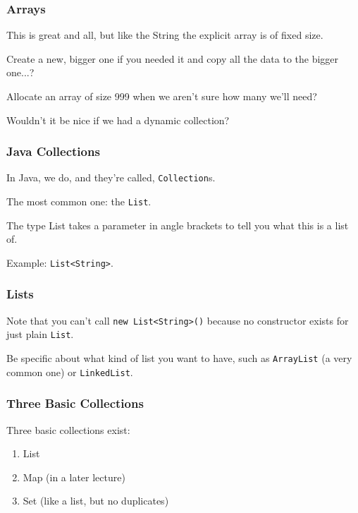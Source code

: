 \begin{frame}
\frametitle{Arrays}
\begin{changemargin}{1cm}

This is great and all, but like the String the explicit array is of fixed size.

Create a new, bigger one if you needed it and copy all the data to the bigger one...? 

Allocate an array of size 999 when we aren't sure how many we'll need?

Wouldn't it be nice if we had a dynamic collection?


\end{changemargin}
\end{frame}


\begin{frame}
\frametitle{Java Collections}
\begin{changemargin}{1cm}

In Java, we do, and they're called, \texttt{Collection}s. 

The most common one: the \texttt{List}. 

The type List takes a parameter in angle brackets to tell you what this is a list of. 

Example: \texttt{List<String>}.

\end{changemargin}
\end{frame}

\begin{frame}
\frametitle{Lists}
\begin{changemargin}{1cm}

Note that you can't call \texttt{new List<String>()} because no constructor exists for just plain \texttt{List}. 

Be specific about what kind of list you want to have, such as \texttt{ArrayList} (a very common one) or \texttt{LinkedList}.


\end{changemargin}
\end{frame}

\begin{frame}
\frametitle{Three Basic Collections}
\begin{changemargin}{1cm}

Three basic collections exist:

\begin{enumerate}
	\item List
	\item Map (in a later lecture)
	\item Set (like a list, but no duplicates)
\end{enumerate}


\end{changemargin}
\end{frame}

